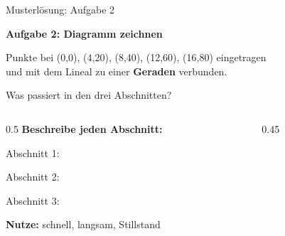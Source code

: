 \documentclass[aspectratio=169,11pt]{beamer}
\newcommand{\luecke}[1]{\underline{\hspace{#1}}}
\begin{document}
\begin{frame}{Musterlösung: Aufgabe 2}
    \begin{center}
        \begin{mlbox}
            \textbf{Aufgabe 2: Diagramm zeichnen}

            \vspace{0.5em}
            Punkte bei (0,0), (4,20), (8,40), (12,60), (16,80) eingetragen\\
            und mit dem Lineal zu einer \textcolor{loesung}{\textbf{Geraden}} verbunden.
        \end{mlbox}
    \end{center}
\end{frame}


\begin{frame}{Was passiert in den drei Abschnitten?}
    \begin{columns}
        \begin{column}{0.5\textwidth}
            \textbf{Beschreibe jeden Abschnitt:}

            \vspace{1em}
            Abschnitt 1: \luecke{3.5cm}

            \vspace{0.8em}
            Abschnitt 2: \luecke{3.5cm}

            \vspace{0.8em}
            Abschnitt 3: \luecke{3.5cm}

            \vspace{1em}
            \textbf{Nutze:} schnell, langsam, Stillstand
        \end{column}
        \begin{column}{0.45\textwidth}
        \end{column}
    \end{columns}
\end{frame}
\end{document}
